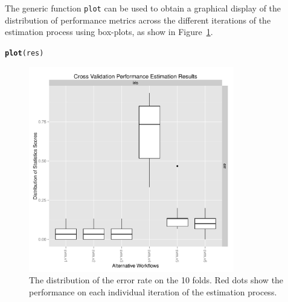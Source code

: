 \documentclass[10pt,a4paper]{article}\usepackage[]{graphicx}\usepackage[]{color}
\makeatletter
\newcommand{\hlstd}[1]{\textcolor[rgb]{0.345,0.345,0.345}{#1}}%
\newcommand{\hlkwd}[1]{\textcolor[rgb]{0.737,0.353,0.396}{\textbf{#1}}}%
\newenvironment{kframe}{%
 \def\at@end@of@kframe{}%
 \ifinner\ifhmode%
  \def\at@end@of@kframe{\end{minipage}}%
  \begin{minipage}{\columnwidth}%
 \fi\fi%
 \def\FrameCommand##1{\hskip\@totalleftmargin \hskip-\fboxsep
 \colorbox{shadecolor}{##1}\hskip-\fboxsep
     \hskip-\linewidth \hskip-\@totalleftmargin \hskip\columnwidth}%
 \MakeFramed {\advance\hsize-\width
   \@totalleftmargin\z@ \linewidth\hsize
   \@setminipage}}%
 {\par\unskip\endMakeFramed%
 \at@end@of@kframe}
\newenvironment{knitrout}{}{} %
\makeatother
\begin{document}


The generic function \texttt{plot} can be used to obtain a graphical
display of the distribution of performance metrics across the
different iterations of the estimation process using box-plots, as
show in Figure~\ref{fig:ex1Iris}. 

\begin{knitrout}\footnotesize
{}\color{fgcolor}\begin{kframe}
\begin{alltt}
\hlkwd{plot}\hlstd{(res)}
\end{alltt}
\end{kframe}\begin{figure}[]


{\centering \includegraphics[width=0.8\textwidth]{figures/perfEst-ex1Iris} 

}

\caption[The distribution of the error rate on the 10 folds]{The distribution of the error rate on the 10 folds. Red dots show the performance on each individual iteration of the estimation process.\label{fig:ex1Iris}}
\end{figure}


\end{knitrout}

\end{document}
